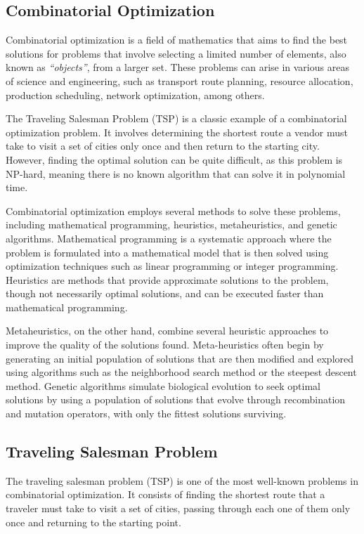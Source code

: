 \documentclass[conference]{IEEEtran}
\begin{document}
    \subsection{Combinatorial Optimization}
    Combinatorial optimization is a field of mathematics that aims to find the best solutions for problems that involve selecting a limited number of elements, also known as \textit{``objects''}, from a larger set. These problems can arise in various areas of science and engineering, such as transport route planning, resource allocation, production scheduling, network optimization, among others.

    The Traveling Salesman Problem (TSP) is a classic example of a combinatorial optimization problem. It involves determining the shortest route a vendor must take to visit a set of cities only once and then return to the starting city. However, finding the optimal solution can be quite difficult, as this problem is NP-hard, meaning there is no known algorithm that can solve it in polynomial time.

    Combinatorial optimization employs several methods to solve these problems, including mathematical programming, heuristics, metaheuristics, and genetic algorithms. Mathematical programming is a systematic approach where the problem is formulated into a mathematical model that is then solved using optimization techniques such as linear programming or integer programming. Heuristics are methods that provide approximate solutions to the problem, though not necessarily optimal solutions, and can be executed faster than mathematical programming.

    Metaheuristics, on the other hand, combine several heuristic approaches to improve the quality of the solutions found. Meta-heuristics often begin by generating an initial population of solutions that are then modified and explored using algorithms such as the neighborhood search method or the steepest descent method. Genetic algorithms simulate biological evolution to seek optimal solutions by using a population of solutions that evolve through recombination and mutation operators, with only the fittest solutions surviving.

    \subsection{Traveling Salesman Problem}

    The traveling salesman problem (TSP) is one of the most well-known problems in combinatorial optimization. It consists of finding the shortest route that a traveler must take to visit a set of cities, passing through each one of them only once and returning to the starting point.
\end{document}
